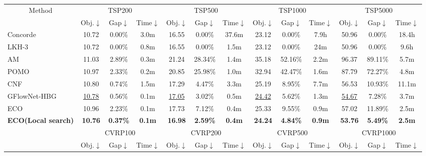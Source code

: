 \documentclass{article}
\theoremstyle{plain}
\theoremstyle{definition}
\theoremstyle{remark}
\begin{document}
\begin{table}[t]
{\begin{tabular}{l|ccc|ccc|ccc|ccc}
\toprule
\multicolumn{1}{c|}{\multirow{2}{*}{Method}} & \multicolumn{3}{c|}{\cellcolor{tspgreen}TSP200} & \multicolumn{3}{c|}{\cellcolor{tspgreen}TSP500} & \multicolumn{3}{c|}{\cellcolor{tspgreen}TSP1000} & \multicolumn{3}{c}{\cellcolor{tspgreen}TSP5000} \\
 & \cellcolor{tspgreen}Obj.$\downarrow$ & \cellcolor{tspgreen}Gap$\downarrow$ & \cellcolor{tspgreen}Time$\downarrow$ & \cellcolor{tspgreen}Obj.$\downarrow$ & \cellcolor{tspgreen}Gap$\downarrow$ & \cellcolor{tspgreen}Time$\downarrow$ & \cellcolor{tspgreen}Obj.$\downarrow$ & \cellcolor{tspgreen}Gap$\downarrow$ & \cellcolor{tspgreen}Time$\downarrow$ & \cellcolor{tspgreen}Obj.$\downarrow$ & \cellcolor{tspgreen}Gap$\downarrow$ & \cellcolor{tspgreen}Time$\downarrow$ \\ \midrule
Concorde & 10.72 & 0.00\% & 3.0m & 16.55 & 0.00\% & 37.6m & 23.12 & 0.00\% & 7.9h & 50.96 & 0.00\% & 18.4h \\
LKH-3 & 10.72 & 0.00\% & 0.8m & 16.55 & 0.00\% & 1.5m & 23.12 & 0.00\% & 24m & 50.96 & 0.00\% & 9.6h \\ \midrule
AM & 11.03 & 2.89\% & 0.3m & 21.24 & 28.34\% & 1.4m & 35.18 & 52.16\% & 2.2m & 96.37 & 89.11\% & 5.7m \\
POMO & 10.97 & 2.33\% & 0.2m & 20.85 & 25.98\% & 1.0m & 32.94 & 42.47\% & 1.6m & 87.79 & 72.27\% & 4.8m \\
CNF & 10.80 & 0.74\% & 1.5m & 17.29 & 4.47\% & 3.3m & 25.19 & 8.95\% & 7.7m & 56.53 & 10.93\% & 11.1m \\
GFlowNet-HBG & \underline{10.78} & 0.56\% & 0.1m & \underline{17.05} & 3.02\% & 0.5m & \underline{24.42} & 5.62\% & 1.3m & \underline{54.67} & 7.28\% & 3.7m \\
ECO & 10.96 & 2.23\% & 0.1m & 17.73 & 7.12\% & 0.4m & 25.33 & 9.55\% & 0.9m & 57.02 & 11.89\% & 2.5m \\
\textbf{ECO(Local search)} & \textbf{10.76} & \textbf{0.37\%} & \textbf{0.1m} & \textbf{16.98} & \textbf{2.59\%} & \textbf{0.4m} & \textbf{24.24} & \textbf{4.84\%} & \textbf{0.9m} & \textbf{53.76} & \textbf{5.49\%} & \textbf{2.5m} \\ \midrule
 & \multicolumn{3}{c|}{\cellcolor{cvrpblue}CVRP100} & \multicolumn{3}{c|}{\cellcolor{cvrpblue}CVRP200} & \multicolumn{3}{c|}{\cellcolor{cvrpblue}CVRP500} & \multicolumn{3}{c}{\cellcolor{cvrpblue}CVRP1000} \\
 & \cellcolor{cvrpblue}Obj.$\downarrow$ & \cellcolor{cvrpblue}Gap$\downarrow$ & \cellcolor{cvrpblue}Time$\downarrow$ & \cellcolor{cvrpblue}Obj.$\downarrow$ & \cellcolor{cvrpblue}Gap$\downarrow$ & \cellcolor{cvrpblue}Time$\downarrow$ & \cellcolor{cvrpblue}Obj.$\downarrow$ & \cellcolor{cvrpblue}Gap$\downarrow$ & \cellcolor{cvrpblue}Time$\downarrow$ & \cellcolor{cvrpblue}Obj.$\downarrow$ & \cellcolor{cvrpblue}Gap$\downarrow$ & \cellcolor{cvrpblue}Time$\downarrow$ \\ \midrule

\end{tabular}}
\end{table}
\end{document}
